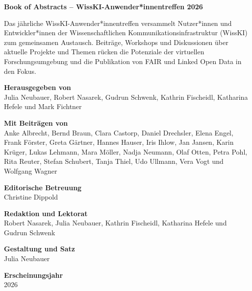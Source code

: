 \pagestyle{titelseite}

\textbf{Book of Abstracts -- WissKI-Anwender*innentreffen 2026}

\vspace{0.5cm}

Das jährliche WissKI-Anwender*innentreffen versammelt Nut\-zer*in\-nen und Ent\-wick\-ler*in\-nen der Wissenschaftlichen Kommunikationsinfrastruktur (WissKI) zum gemeinsamen Austausch. Beiträge, Workshops und Diskussionen über aktuelle Projekte und Themen rücken die Potenziale der virtuellen Forschungsumgebung und die Publikation von FAIR und Linked Open Data in den Fokus.

\vspace{0.5cm}

\textbf{Herausgegeben von}\\
Julia Neubauer, Robert Nasarek, Gudrun Schwenk, Kathrin Fischeidl, Katharina Hefele und Mark Fichtner

\vspace{0.5cm}

\textbf{Mit Beiträgen von}\\
Anke Albrecht, Bernd Braun, Clara Castorp, Daniel Drechsler, Elena Engel, Frank Förster, Greta Gärtner, Hannes Hauser, Iris Ihlow, Jan Jansen, Karin Krüger, Lukas Lehmann, Mara Möller, Nadja Neumann, Olaf Otten, Petra Pohl, Rita Reuter, Stefan Schubert, Tanja Thiel, Udo Ullmann, Vera Vogt und Wolfgang Wagner

\vspace{0.5cm}

\textbf{Editorische Betreuung}\\
Christine Dippold

\vspace{0.5cm}

\textbf{Redaktion und Lektorat}\\
Robert Nasarek, Julia Neubauer, Kathrin Fischeidl, Katharina Hefele und Gudrun Schwenk

\vspace{0.5cm}

\textbf{Gestaltung und Satz}\\
Julia Neubauer

\vspace{0.5cm}

\textbf{Erscheinungsjahr}\\
2026

\vspace{0.5cm}

